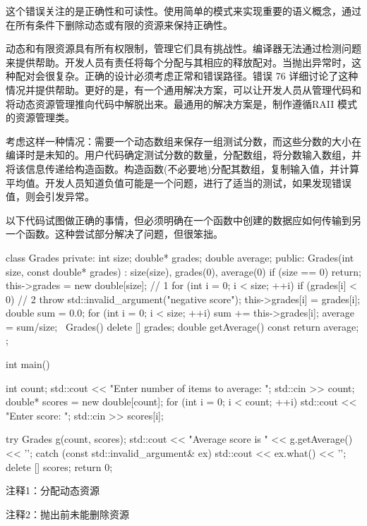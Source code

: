 这个错误关注的是正确性和可读性。使用简单的模式来实现重要的语义概念，通过在所有条件下删除动态或有限的资源来保持正确性。

动态和有限资源具有所有权限制，管理它们具有挑战性。编译器无法通过检测问题来提供帮助。开发人员有责任将每个分配与其相应的释放配对。当抛出异常时，这种配对会很复杂。正确的设计必须考虑正常和错误路径。错误 76 详细讨论了这种情况并提供帮助。更好的是，有一个通用解决方案，可以让开发人员从管理代码和将动态资源管理推向代码中解脱出来。最通用的解决方案是，制作遵循RAII 模式的资源管理类。


考虑这样一种情况：需要一个动态数组来保存一组测试分数，而这些分数的大小在编译时是未知的。用户代码确定测试分数的数量，分配数组，将分数输入数组，并将该信息传递给构造函数。构造函数(不必要地)分配其数组，复制输入值，并计算平均值。开发人员知道负值可能是一个问题，进行了适当的测试，如果发现错误值，则会引发异常。

以下代码试图做正确的事情，但必须明确在一个函数中创建的数据应如何传输到另一个函数。这种尝试部分解决了问题，但很笨拙。


\begin{cpp}
class Grades {
private:
  int size;
  double* grades;
  double average;
public:
  Grades(int size, const double* grades) : size(size), grades(0),
         average(0) {
    if (size == 0)
      return;
    this->grades = new double[size]; // 1
    for (int i = 0; i < size; ++i) {
      if (grades[i] < 0) // 2
      throw std::invalid_argument("negative score");
      this->grades[i] = grades[i];
    }
    double sum = 0.0;
    for (int i = 0; i < size; ++i)
      sum += this->grades[i];
    average = sum/size;
  }
  ~Grades() { delete [] grades; }
  double getAverage() const { return average; }
};

int main() {
  int count;
  std::cout << "Enter number of items to average: ";
  std::cin >> count;
  double* scores = new double[count];
  for (int i = 0; i < count; ++i) {
    std::cout << "Enter score: ";
    std::cin >> scores[i];
  }

  try {
    Grades g(count, scores);
    std::cout << "Average score is " << g.getAverage() << '\n';
  } catch (const std::invalid_argument& ex) {
    std::cout << ex.what() << '\n';
  }
  delete [] scores;
  return 0;
}
\end{cpp}

{\footnotesize
注释1：分配动态资源

注释2：抛出前未能删除资源
}

